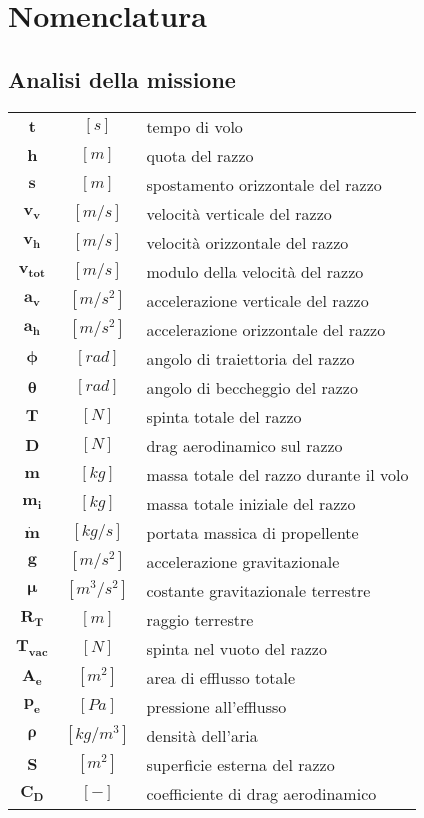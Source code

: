 \section{Nomenclatura}
\label{sec:nomenclatura}
\setcounter{subsection}{1}

\begin{multicols}{2}

	\subsection{Analisi della missione}
	\small
	\begin{tabularx}{\linewidth}{ccX}
		$\bm{t}$ & $[s]$ & tempo di volo \\
		$\bm{h}$ & $[m]$ & quota del razzo \\
		$\bm{s}$ & $[m]$ & spostamento orizzontale del razzo \\
		$\bm{v_v}$ & $[m/s]$ & velocità verticale del razzo \\
		$\bm{v_h}$ & $[m/s]$ & velocità orizzontale del razzo \\
		$\bm{v_{tot}}$ & $[m/s]$ & modulo della velocità del razzo \\
		$\bm{a_v}$ & $[m/s^2]$ & accelerazione verticale del razzo \\
		$\bm{a_h}$ & $[m/s^2]$ & accelerazione orizzontale del razzo \\
		$\bm{\phi}$ & $[rad]$ & angolo di traiettoria del razzo \\
		$\bm{\theta}$ & $[rad]$ & angolo di beccheggio del razzo \\
		$\bm{T}$ & $[N]$ & spinta totale del razzo \\
		$\bm{D}$ & $[N]$ & drag aerodinamico sul razzo \\
		$\bm{m}$ & $[kg]$ & massa totale del razzo durante il volo \\
		$\bm{m_i}$ & $[kg]$ & massa totale iniziale del razzo \\
		$\bm{\dot{m}}$ & $[kg/s]$ & portata massica di propellente \\
		$\bm{g}$ & $[m/s^2]$ & accelerazione gravitazionale \\
		$\bm{\mu}$ & $[m^3/s^2]$ & costante gravitazionale terrestre \\
		$\bm{R_T}$ & $[m]$ & raggio terrestre \\
		$\bm{T_{vac}}$ & $[N]$ & spinta nel vuoto del razzo \\
		$\bm{A_e}$ & $[m^2]$ & area di efflusso totale \\
		$\bm{p_e}$ & $[Pa]$ & pressione all'efflusso \\
		$\bm{\rho}$ & $[kg/m^3]$ & densità dell'aria \\
		$\bm{S}$ & $[m^2]$ & superficie esterna del razzo \\
		$\bm{C_D}$ & $[-]$ & coefficiente di drag aerodinamico
	\end{tabularx}


\end{multicols}
